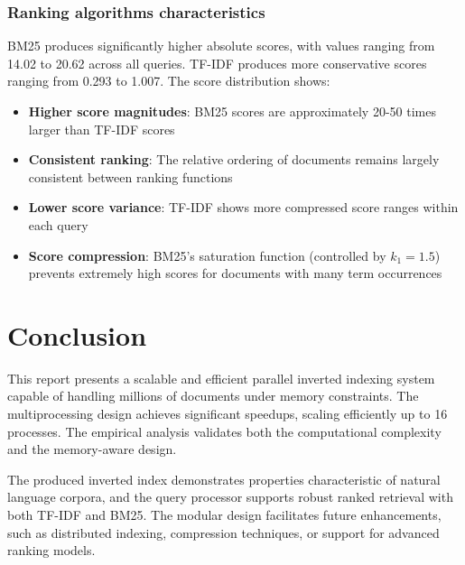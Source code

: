 \documentclass[sigconf]{acmart}
\begin{document}
\subsubsection{Ranking algorithms characteristics}
BM25 produces significantly higher absolute scores, with values ranging from 14.02 to 20.62 across all queries. TF-IDF produces more conservative scores ranging from 0.293 to 1.007. The score distribution shows:
\begin{itemize}
    \item \textbf{Higher score magnitudes}: BM25 scores are approximately 20-50 times larger than TF-IDF scores
    \item \textbf{Consistent ranking}: The relative ordering of documents remains largely consistent between ranking functions
    \item \textbf{Lower score variance}: TF-IDF shows more compressed score ranges within each query
    \item \textbf{Score compression}: BM25's saturation function (controlled by $k_1 = 1.5$) prevents extremely high scores for documents with many term occurrences
\end{itemize}


\section{Conclusion}
This report presents a scalable and efficient parallel inverted indexing system capable of handling millions of documents under memory constraints. The multiprocessing design achieves significant speedups, scaling efficiently up to 16 processes. The empirical analysis validates both the computational complexity and the memory-aware design.

The produced inverted index demonstrates properties characteristic of natural language corpora, and the query processor supports robust ranked retrieval with both TF-IDF and BM25. The modular design facilitates future enhancements, such as distributed indexing, compression techniques, or support for advanced ranking models.
\end{document}
